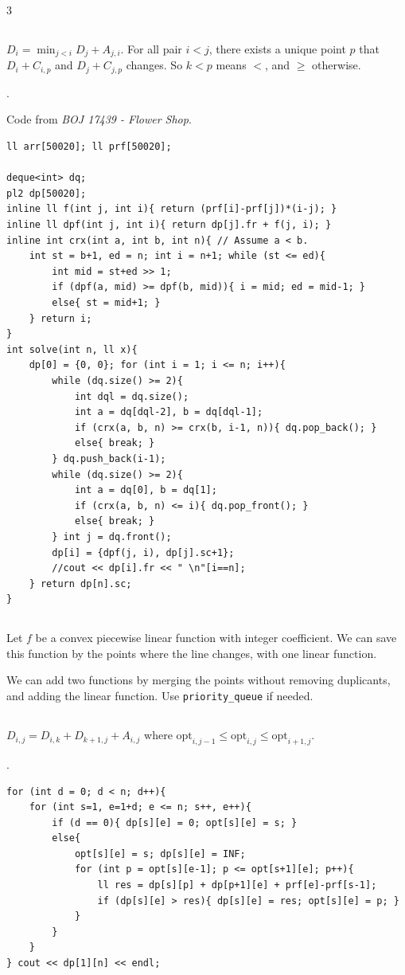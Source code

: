 \documentclass[landscape, 8pt, a4paper, oneside]{extarticle}
\begin{document}
\begin{multicols*}{3}
\subsection{}
$D_i = \min_{j<i} D_j + A_{j,i}$. For all pair $i < j$, there exists a unique point $p$ that $D_i + C_{i,p}$ and $D_j + C_{j,p}$ changes. So $k < p$ means $<$, and $\ge$ otherwise.

.

Code from \textit{BOJ 17439 - Flower Shop}.
\begin{verbatim}
ll arr[50020]; ll prf[50020];

deque<int> dq;
pl2 dp[50020];
inline ll f(int j, int i){ return (prf[i]-prf[j])*(i-j); }
inline ll dpf(int j, int i){ return dp[j].fr + f(j, i); }
inline int crx(int a, int b, int n){ // Assume a < b.
	int st = b+1, ed = n; int i = n+1; while (st <= ed){
		int mid = st+ed >> 1;
		if (dpf(a, mid) >= dpf(b, mid)){ i = mid; ed = mid-1; }
		else{ st = mid+1; }
	} return i;
}
int solve(int n, ll x){
	dp[0] = {0, 0}; for (int i = 1; i <= n; i++){
		while (dq.size() >= 2){
			int dql = dq.size();
			int a = dq[dql-2], b = dq[dql-1];
			if (crx(a, b, n) >= crx(b, i-1, n)){ dq.pop_back(); }
			else{ break; }
		} dq.push_back(i-1);
		while (dq.size() >= 2){
			int a = dq[0], b = dq[1];
			if (crx(a, b, n) <= i){ dq.pop_front(); }
			else{ break; }
		} int j = dq.front();
		dp[i] = {dpf(j, i), dp[j].sc+1};
		//cout << dp[i].fr << " \n"[i==n];
	} return dp[n].sc;
}
\end{verbatim}
\subsection{}
Let $f$ be a convex piecewise linear function with integer coefficient.
We can save this function by the points where the line changes, with one linear function.

We can add two functions by merging the points without removing duplicants, and adding the linear function.
Use \texttt{priority\_queue} if needed.
\subsection{}
$D_{i,j} = D_{i,k} + D_{k+1,j} + A_{i,j}$ where $\mathrm{opt}_{i,j-1} \le \mathrm{opt}_{i,j} \le \mathrm{opt}_{i+1,j}$.

.
\begin{verbatim}
for (int d = 0; d < n; d++){
	for (int s=1, e=1+d; e <= n; s++, e++){
		if (d == 0){ dp[s][e] = 0; opt[s][e] = s; }
		else{
			opt[s][e] = s; dp[s][e] = INF;
			for (int p = opt[s][e-1]; p <= opt[s+1][e]; p++){
				ll res = dp[s][p] + dp[p+1][e] + prf[e]-prf[s-1];
				if (dp[s][e] > res){ dp[s][e] = res; opt[s][e] = p; }
			}
		}
	}
} cout << dp[1][n] << endl;
\end{verbatim}

\end{multicols*}
\end{document}
